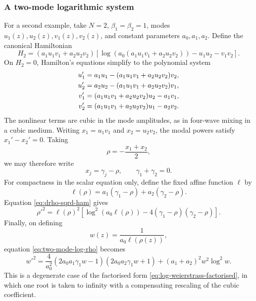\documentclass[11pt,a4paper]{article}
\numberwithin{equation}{section}
\begin{document}
\subsubsection{A two-mode logarithmic system}

For a second example, take $N=2$, $\beta_1=\beta_2=1$, modes $u_1(z),u_2(z),v_1(z),v_2(z)$, and constant parameters $a_0,a_1,a_2$. Define the canonical Hamiltonian
\begin{equation}
    H_2
    =
    (a_1u_1v_1+a_2u_2v_2)
    \left[
        \log\left(
            a_0(a_1u_1v_1+a_2u_2v_2)
        \right)
        -
        u_1u_2-v_1v_2
    \right]. \label{eq:two-mode-log-hamiltonian}
\end{equation}
On $H_2=0$, Hamilton's equations simplify to the polynomial system
\begin{align}
    u_1'
    &=
    a_1u_1
    -
    (a_1u_1v_1+a_2u_2v_2)v_2,
    \notag \\
    u_2'
    &=
    a_2u_2
    -
    (a_1u_1v_1+a_2u_2v_2)v_1,
    \notag \\
    v_1'
    &=
    (a_1u_1v_1+a_2u_2v_2)u_2
    -
    a_1v_1,
    \notag \\
    v_2'
    &=
    (a_1u_1v_1+a_2u_2v_2)u_1
    -
    a_2v_2.
    \label{eq:two-mode-log-polynomial}
\end{align}
The nonlinear terms are cubic in the mode amplitudes, as in four-wave mixing in a cubic medium.
Writing $x_1=u_1v_1$ and $x_2=u_2v_2$, the modal powers satisfy $x_1'-x_2'=0$. Taking
\begin{equation}
    \rho=-\frac{x_1+x_2}{2},
\end{equation}
we may therefore write
\begin{equation}
    x_j=\gamma_j-\rho,
    \qquad
    \gamma_1+\gamma_2=0.
\end{equation}
For compactness in the scalar equation only, define the fixed affine function $\ell$ by
\begin{equation}
    \ell(\rho)
    =
    a_1(\gamma_1-\rho)
    +
    a_2(\gamma_2-\rho).
\end{equation}
Equation \eqref{eq:drho-sqrd-ham} gives
\begin{equation}
    \rho'^2
    =
    \ell(\rho)^2
    \left[
        \log^2(a_0\ell(\rho))
        -
        4(\gamma_1-\rho)(\gamma_2-\rho)
    \right]. \label{eq:two-mode-log-rho}
\end{equation}
Finally, on defining
\begin{equation}
    w(z)=\frac{1}{a_0\ell(\rho(z))},
\end{equation}
equation \eqref{eq:two-mode-log-rho} becomes
\begin{equation}
    w'^2
    =
    \frac{4}{a_0^2}
    \left(2a_0a_1\gamma_1w-1\right)
    \left(2a_0a_2\gamma_1w+1\right)
    +
    (a_1+a_2)^2w^2\log^2w. \label{eq:two-mode-log-weierstrass}
\end{equation}
This is a degenerate case of the factorised form \eqref{eq:log-weierstrass-factorised}, in which one root is taken to infinity with a compensating rescaling of the cubic coefficient.
\end{document}
